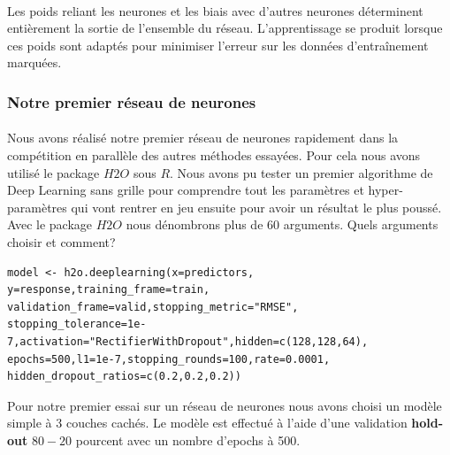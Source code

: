 \documentclass[14pt, openany]{article}
\begin{document}
\paragraph{}
Les poids reliant les neurones et les biais avec d'autres neurones déterminent entièrement la sortie de l'ensemble du réseau. L'apprentissage se produit lorsque ces poids sont adaptés pour minimiser l'erreur sur les données d'entraînement marquées.

\subsubsection{Notre premier réseau de neurones}

\paragraph{}
Nous avons réalisé notre premier réseau de neurones rapidement dans la compétition en parallèle des autres méthodes essayées. Pour cela nous avons utilisé le package $H2O$ sous $R$. Nous avons pu tester un premier algorithme de Deep Learning sans grille pour comprendre tout les paramètres et hyper-paramètres qui vont rentrer en jeu ensuite pour avoir un résultat le plus poussé. Avec le package $H2O$ nous dénombrons plus de $60$ arguments. Quels arguments choisir et comment?

\begin{verbatim}
model <- h2o.deeplearning(x=predictors, y=response,training_frame=train,
validation_frame=valid,stopping_metric="RMSE",
stopping_tolerance=1e-7,activation="RectifierWithDropout",hidden=c(128,128,64), 
epochs=500,l1=1e-7,stopping_rounds=100,rate=0.0001,
hidden_dropout_ratios=c(0.2,0.2,0.2))
\end{verbatim}

Pour notre premier essai sur un réseau de neurones nous avons choisi un modèle simple à 3 couches cachés. Le modèle est effectué à l'aide d'une validation \textbf{hold-out}  $80-20$ pourcent avec un nombre d'epochs à 500.
\end{document}
